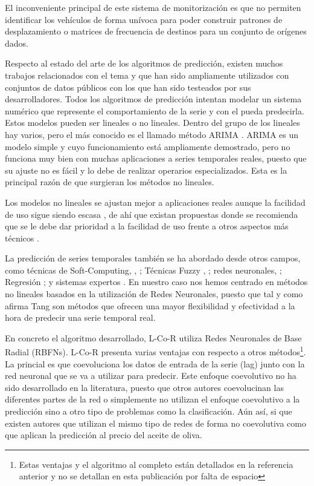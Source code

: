 \documentclass[runningheads]{llncs}
\begin{document}
 
El inconveniente principal de este sistema de monitorización es que no permiten identificar los
vehículos de forma unívoca para poder construir patrones de desplazamiento o matrices de frecuencia
de destinos para un conjunto de orígenes dados. 

Respecto al estado del arte de los algoritmos de predicción, existen muchos trabajos relacionados
con el tema y que han sido ampliamente utilizados con conjuntos de datos públicos con los que han
sido testeados por sus desarrolladores. Todos los algoritmos de predicción intentan modelar un
sistema numérico que represente el comportamiento de la serie y con el pueda predecirla. Estos
modelos pueden ser lineales o no lineales. 
Dentro del grupo de los lineales hay varios, pero el más conocido es el llamado método ARIMA
\cite{BoxJenk}. ARIMA es un modelo simple y cuyo funcionamiento está ampliamente demostrado, pero
no funciona muy bien con muchas aplicaciones a series temporales reales, puesto que su ajuste no es
fácil y lo debe de realizar operarios especializados. Esta es la principal razón de que surgieran
los métodos no lineales. 

Los modelos no lineales se ajustan mejor a aplicaciones reales aunque la facilidad de uso sigue
siendo escasa \cite{Clements2004}, de ahí que existan propuestas donde se recomienda que se le debe
dar prioridad a la facilidad de uso frente a otros aspectos más técnicos \cite{Gooijer25years}. %

La predicción de series temporales también se ha abordado desde otros campos, como técnicas de
Soft-Computing, \cite{Samanta2011}, \cite{Zhu2011}; Técnicas Fuzzy \cite{Qiu2011}, \cite{Wang2011};
redes neuronales, \cite{Yu2010}; Regresión \cite{Kavaklioglu2011}; y sistemas expertos
\cite{Dash1995}. En nuestro caso nos hemos centrado en métodos no lineales basados en la utilización de Redes
Neuronales, puesto que tal y como afirma Tang \cite{Tang1991} son métodos que ofrecen una mayor
flexibilidad y efectividad a la hora de predecir una serie temporal
real.  

En concreto el algoritmo desarrollado, L-Co-R \cite{Eli2012} utiliza Redes Neuronales de Base Radial (RBFNs). L-Co-R
\cite{Eli2012} presenta varias ventajas con respecto a otros métodos\footnote{Estas ventajas y el algoritmo al completo están
detallados en la referencia anterior y no se detallan en esta publicación por falta de espacio}. La princial es que coevoluciona
los datos de entrada de la serie (lag) junto con la red neuronal que se va a utilizar para predecir. Este enfoque coevolutivo no
ha sido desarrollado en la literatura, puesto que otros autores coevolucinan las diferentes partes de la red o
simplemente no utilizan el enfoque coevolutivo a la predicción sino a otro tipo de problemas como la clasificación. Aún así, si
que existen autores que utilizan el mismo tipo de redes de forma no coevolutiva como \cite{Hippert10,Lee09,PerezGodoy2010} que
aplican la predicción al precio del aceite de oliva.
\end{document}
